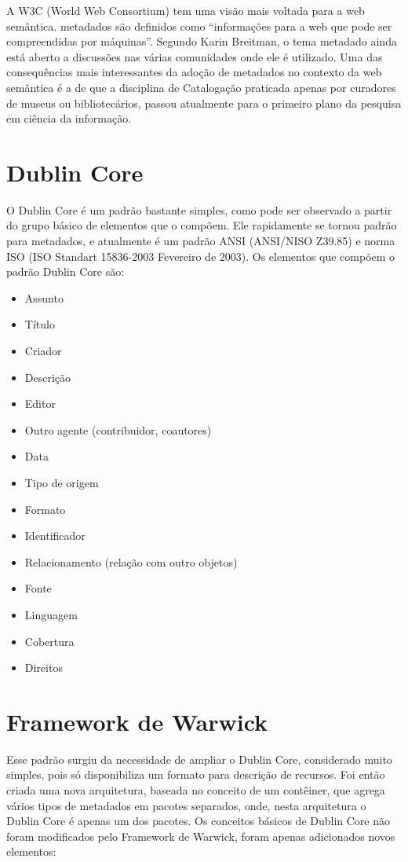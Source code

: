 A W3C (World Web Consortium) tem uma visão mais voltada para a web semântica. metadados são definidos como “informações para a web que pode ser compreendidas por máquinas”. Segundo Karin Breitman,  o tema metadado ainda está aberto a discussões nas várias comunidades onde ele é utilizado. Uma das consequências mais interessantes da adoção de metadados no contexto da web semântica é a de que a disciplina de Catalogação praticada apenas por curadores de museus ou bibliotecários, passou atualmente para o primeiro plano da pesquisa em ciência da informação. 

\section{Dublin Core}

O Dublin Core é um padrão bastante simples, como pode ser observado a partir do grupo básico de elementos que o compõem. Ele rapidamente se tornou padrão para metadados, e atualmente é um padrão ANSI (ANSI/NISO Z39.85) e norma ISO (ISO Standart 15836-2003 Fevereiro de 2003). Os elementos que compõem o padrão Dublin Core são: 

\begin{itemize}
\item Assunto
\item Título
\item Criador
\item Descrição
\item Editor
\item Outro agente (contribuidor, coautores)
\item Data
\item Tipo de origem
\item Formato
\item Identificador
\item Relacionamento (relação com outro objetos)
\item Fonte
\item Linguagem
\item Cobertura
\item Direitos
\end{itemize}

\section{Framework de Warwick}

Esse padrão surgiu da necessidade de ampliar o Dublin Core, considerado muito simples, pois só disponibiliza um formato para descrição de recursos. Foi então criada uma nova arquitetura, baseada no conceito de um contêiner, que agrega vários tipos de metadados em pacotes separados, onde, nesta arquitetura o Dublin Core é apenas um dos pacotes. Os conceitos básicos de Dublin Core não foram modificados pelo Framework de Warwick, foram apenas adicionados novos elementos: 

